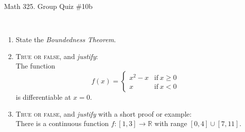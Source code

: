\documentclass[12pt]{amsart}
\newcommand{\R}{\mathbb{R}}
\begin{document}
	
	\thispagestyle{empty}
	
	\begin{center}
		\Large{Math 325. Group Quiz \#10b }\\

	\end{center}
	
	\
	
\begin{enumerate}
		\item State the \textit{Boundedness Theorem}. 
		\vfill
		\vfill



\item  \textsc{True or false}, and \emph{justify}:\\
 The function 
 \[ f(x) = \begin{cases} x^2 - x & \text{if} \ x\geq 0 \\ x & \text{if} \ x<0 \end{cases}\]
	is differentiable at $x=0$.
	
	
	\vfill	\vfill\vfill
	

\newpage	
	
\item  \textsc{True or false}, and \emph{justify} with a short proof or example:\\
There is a continuous function $f: [1,3] \to \R$ with range $[0,4] \cup [7,11]$.

\vfill\vfill\vfill





\end{enumerate}


	
\end{document}
